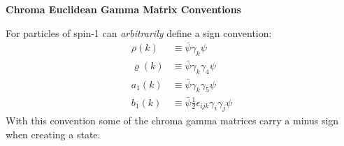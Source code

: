 \documentclass[12pt]{article}
\begin{document}
\newcommand{\half}{\frac{1}{2}}
\newcommand{\be}{\begin{displaymath}}
\newcommand{\ee}{\end{displaymath}}
\newcommand{\bea}{\begin{eqnarray}}
\newcommand{\eea}{\end{eqnarray}}
\newcommand{\bdm}{\begin{displaymath}}
\newcommand{\edm}{\end{displaymath}}
\newcommand{\<}{\langle}
\renewcommand{\>}{\rangle}
\newcommand{\Tr}{\mbox{Tr}}

\centerline{\bf \Large Chroma Euclidean Gamma Matrix Conventions}
\vskip 5mm

For particles of spin-1 can {\em arbitrarily } define a sign convention:
\begin{align}
  \rho(k) &\equiv \bar{\psi} \gamma_k \psi \nonumber \\
  \varrho(k) &\equiv \bar{\psi} \gamma_k \gamma_4 \psi \nonumber\\
  a_1(k) &\equiv \bar{\psi} \gamma_k \gamma_5 \psi \nonumber\\
  b_1(k) &\equiv \bar{\psi}\tfrac{1}{2}  \epsilon_{ijk} \gamma_i \gamma_j \psi \nonumber
\end{align}
With this convention some of the chroma gamma matrices carry a minus sign when creating a state.\\

\vspace{1cm}
\end{document}
